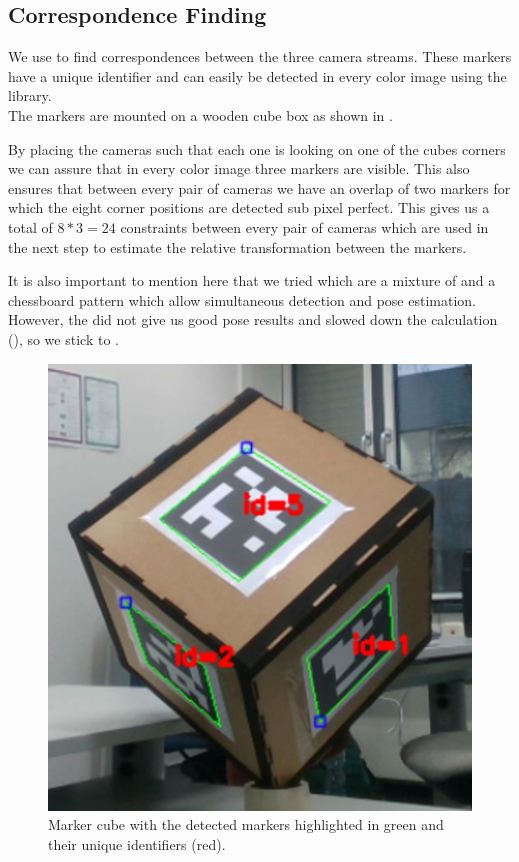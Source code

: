 \documentclass[10pt,twocolumn,letterpaper]{article}
\begin{document}
%

\subsection{Correspondence Finding}
We use \aruco{} to find correspondences between the three camera streams. These markers have a unique identifier and can easily be detected in every color image using the \opencv{} library.\\
The markers are mounted on a wooden cube box as shown in .

By placing the cameras such that each one is looking on one of the cubes corners we can assure that in every color image three markers are visible. This also ensures that between every pair of cameras we have an overlap of two markers for which the eight corner positions are detected sub pixel perfect. This gives us a total of $8*3=24$ constraints between every pair of cameras which are used in the next step to estimate the relative transformation between the markers.

It is also important to mention here that we tried \charuco{} which are a mixture of \aruco{} and a chessboard pattern which allow simultaneous detection and pose estimation. However, the \charuco{} did not give us good pose results and slowed down the calculation (), so we stick to \aruco{}. 
%
%
\begin{figure}[t]
	\begin{center}
		\includegraphics[width=0.6\linewidth]{imgs/cube}
	\end{center}
	\caption{Marker cube with the detected markers highlighted in green and their unique identifiers (red).}
	\label{fig:cube}
\end{figure}
%
%
\end{document}
